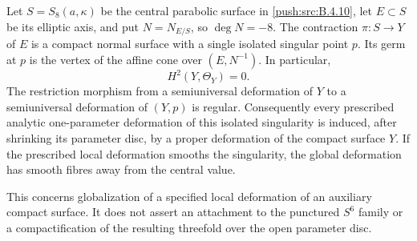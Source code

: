 \begin{proposition}\label{push:src:B.4.11}
Let $S=S_8(a,\kappa)$ be the central parabolic surface in \ref{push:src:B.4.10},
let $E\subset S$ be its elliptic axis, and put
$N=N_{E/S}$, so $\deg N=-8$.
The contraction $\pi:S\to Y$ of $E$ is a compact normal surface
with a single isolated singular point $p$.
Its germ at $p$ is the vertex of the affine cone over
$(E,N^{-1})$.  In particular,
\[
 H^2(Y,\Theta_Y)=0.
\]
The restriction morphism from a semiuniversal deformation of $Y$
to a semiuniversal deformation of $(Y,p)$ is regular.
Consequently every prescribed analytic one-parameter deformation
of this isolated singularity is induced, after shrinking its
parameter disc, by a proper deformation of the compact surface $Y$.
If the prescribed local deformation smooths the singularity, the
global deformation has smooth fibres away from the central value.

This concerns globalization of a specified local deformation of
an auxiliary compact surface.  It does not assert an attachment to
the punctured $S^6$ family or a compactification of the resulting
threefold over the open parameter disc.
\end{proposition}

